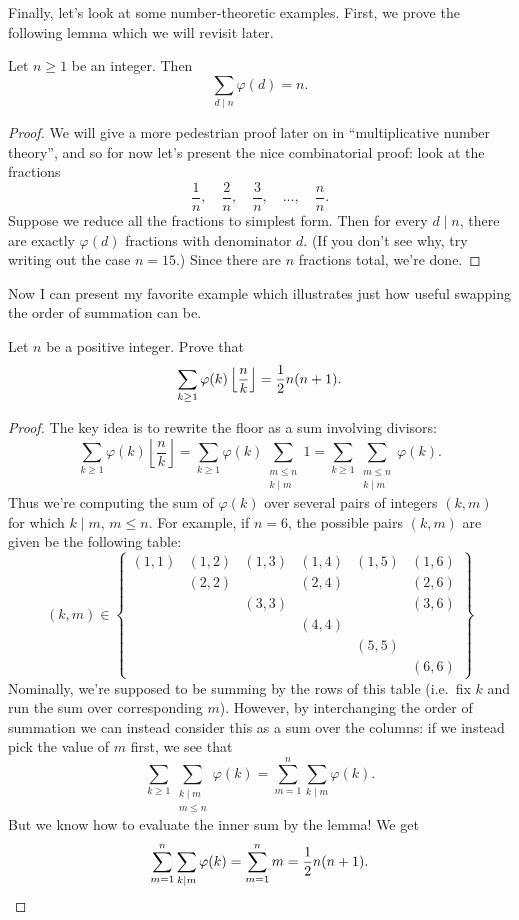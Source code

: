 \documentclass[11pt]{scrartcl}
\begin{document}
Finally, let's look at some number-theoretic examples.
First, we prove the following lemma which we will revisit later.
\begin{lemma}
  [$\varphi \ast \mathbf 1 = \id$]
  Let $n \ge 1$ be an integer.
  Then \[ \sum_{d \mid n} \varphi(d) =  n. \]
\end{lemma}
\begin{proof}
  We will give a more pedestrian proof later on in
  ``multiplicative number theory'', and so for now
  let's present the nice combinatorial proof:
  look at the fractions
  \[
    \frac{1}{n}, \quad \frac{2}{n}, \quad \frac{3}{n},
    \quad \dots, \quad \frac{n}{n}.
  \]
  Suppose we reduce all the fractions to simplest form.
  Then for every $d \mid n$,
  there are exactly $\varphi(d)$ fractions with denominator $d$.
  (If you don't see why, try writing out the case $n=15$.)
  Since there are $n$ fractions total, we're done.
\end{proof}
Now I can present my favorite example which illustrates
just how useful swapping the order of summation can be.
\begin{example}
  Let $n$ be a positive integer.
  Prove that
  \[ \sum_{k \ge 1} \varphi(k) \left\lfloor \frac nk \right\rfloor
    = \frac{1}{2} n (n+1).  \]
\end{example}
\begin{proof}
  The key idea is to rewrite the floor as a sum involving divisors:
  \[ \sum_{k \ge 1} \varphi(k) \left\lfloor \frac nk \right\rfloor
    = \sum_{k \ge 1} \varphi(k) \sum_{\substack{m \le n \\ k \mid m}} 1
    = \sum_{k \ge 1} \sum_{\substack{m \le n \\ k \mid m}} \varphi(k).
  \]
  Thus we're computing the sum of $\varphi(k)$
  over several pairs of integers $(k,m)$ for which $k \mid m$, $m \le n$.
  For example, if $n = 6$, the possible pairs $(k,m)$ are given be the following table:
  \[
    (k,m) \in
    \left\{
    \begin{array}{cccccc}
      (1,1) & (1,2) & (1,3) & (1,4) & (1,5) & (1,6) \\
      & (2,2) && (2,4) && (2,6) \\
      && (3,3) &&& (3,6) \\
      &&& (4,4) && \\
      &&&& (5,5) & \\
      &&&&& (6,6)
    \end{array}
    \right\}
  \]
  Nominally, we're supposed to be summing by the rows of this table
  (i.e.\ fix $k$ and run the sum over corresponding $m$).
  However, by interchanging the order of summation we can instead
  consider this as a sum over the columns:
  if we instead pick the value of $m$ first, we see that
  \[
    \sum_{k \ge 1} \sum_{\substack{k \mid m \\ m \le n}} \varphi(k)
    = \sum_{m = 1}^n \sum_{k \mid m} \varphi(k).
  \]
  But we know how to evaluate the inner sum by the lemma! We get
  \[ \sum_{m = 1}^n \sum_{k \mid m} \varphi(k)
    = \sum_{m=1}^n m = \frac{1}{2} n(n+1). \qedhere \]
\end{proof}
\end{document}
